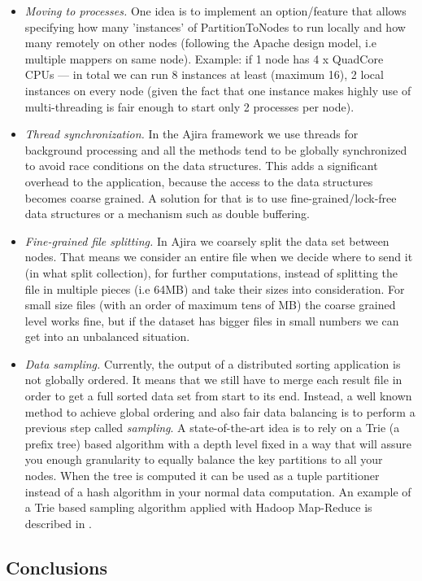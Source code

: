 \begin{itemize}
	\item \textit{Moving to processes.} One idea is to implement an option/feature that allows specifying how many 'instances' of PartitionToNodes to run locally and how many remotely on other nodes (following the Apache design model, i.e multiple mappers on same node). Example: if 1 node has 4 x QuadCore CPUs --- in total we can run 8 instances at least (maximum 16), 2 local instances on every node (given the fact that one instance makes highly use of multi-threading is fair enough to start only 2 processes per node).
	\item \textit{Thread synchronization.} In the Ajira framework we use threads for background processing and all the methods tend to be globally synchronized to avoid race conditions on the data structures. This adds a significant overhead to the application, because the access to the data structures becomes coarse grained. A solution for that is to use fine-grained/lock-free data structures or a mechanism such as double buffering. 
	\item \textit{Fine-grained file splitting.} In Ajira we coarsely split the data set between nodes. That means we consider an entire file when we decide where to send it (in what split collection), for further computations, instead of splitting the file in multiple pieces (i.e 64MB) and take their sizes into consideration. For small size files (with an order of maximum tens of MB) the coarse grained level works fine, but if the dataset has bigger files in small numbers we can get into an unbalanced situation.
	\item \textit{Data sampling.} Currently, the output of a distributed sorting application is not globally ordered. It means that we still have to merge each result file in order to get a full sorted data set from start to its end. Instead, a well known method to achieve global ordering and also fair data balancing is to perform a previous step called \textit{sampling}. A state-of-the-art idea is to rely on a Trie (a prefix tree) based algorithm with a depth level fixed in a way that will assure you enough granularity to equally balance the key partitions to all your nodes. When the tree is computed it can be used as a tuple partitioner instead of a hash algorithm in your normal data computation. An example of a Trie based sampling algorithm applied with Hadoop Map-Reduce is described in \cite{terasort}.
\end{itemize}

\subsection{Conclusions}


